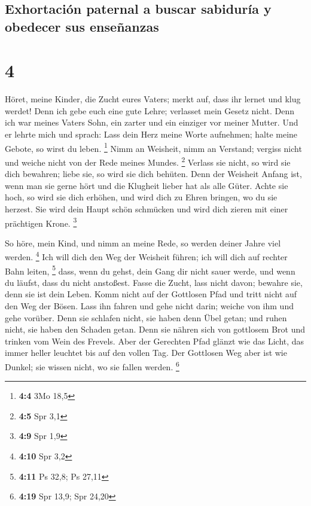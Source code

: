 \hypertarget{exhortaciuxf3n-paternal-a-buscar-sabiduruxeda-y-obedecer-sus-enseuxf1anzas}{%
\subsection{Exhortación paternal a buscar sabiduría y obedecer sus
enseñanzas}\label{exhortaciuxf3n-paternal-a-buscar-sabiduruxeda-y-obedecer-sus-enseuxf1anzas}}

\hypertarget{section-3}{%
\section{4}\label{section-3}}

 Höret, meine Kinder, die Zucht eures Vaters; merkt auf,
dass ihr lernet und klug werdet!  Denn ich gebe euch eine
gute Lehre; verlasset mein Gesetz nicht.  Denn ich war
meines Vaters Sohn, ein zarter und ein einziger vor meiner Mutter.
 Und er lehrte mich und sprach: Lass dein Herz meine Worte
aufnehmen; halte meine Gebote, so wirst du leben. \footnote{\textbf{4:4}
  3Mo 18,5}  Nimm an Weisheit, nimm an Verstand; vergiss
nicht und weiche nicht von der Rede meines Mundes. \footnote{\textbf{4:5}
  Spr 3,1}  Verlass sie nicht, so wird sie dich bewahren;
liebe sie, so wird sie dich behüten.  Denn der Weisheit
Anfang ist, wenn man sie gerne hört und die Klugheit lieber hat als alle
Güter.  Achte sie hoch, so wird sie dich erhöhen, und wird
dich zu Ehren bringen, wo du sie herzest.  Sie wird dein
Haupt schön schmücken und wird dich zieren mit einer prächtigen Krone.
\footnote{\textbf{4:9} Spr 1,9}

 So höre, mein Kind, und nimm an meine Rede, so werden
deiner Jahre viel werden. \footnote{\textbf{4:10} Spr 3,2}
 Ich will dich den Weg der Weisheit führen; ich will dich
auf rechter Bahn leiten, \footnote{\textbf{4:11} Ps 32,8; Ps 27,11}
 dass, wenn du gehst, dein Gang dir nicht sauer werde,
und wenn du läufst, dass du nicht anstoßest.  Fasse die
Zucht, lass nicht davon; bewahre sie, denn sie ist dein Leben.
 Komm nicht auf der Gottlosen Pfad und tritt nicht auf
den Weg der Bösen.  Lass ihn fahren und gehe nicht darin;
weiche von ihm und gehe vorüber.  Denn sie schlafen
nicht, sie haben denn Übel getan; und ruhen nicht, sie haben den Schaden
getan.  Denn sie nähren sich von gottlosem Brot und
trinken vom Wein des Frevels.  Aber der Gerechten Pfad
glänzt wie das Licht, das immer heller leuchtet bis auf den vollen Tag.
 Der Gottlosen Weg aber ist wie Dunkel; sie wissen nicht,
wo sie fallen werden. \footnote{\textbf{4:19} Spr 13,9; Spr 24,20}

